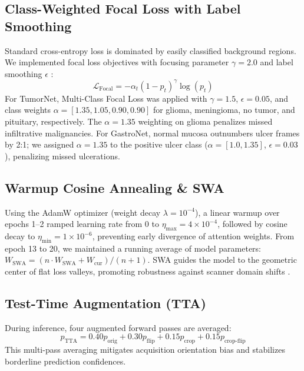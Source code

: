 \documentclass[conference]{IEEEtran}
\begin{document}
\subsection{Class-Weighted Focal Loss with Label Smoothing}
Standard cross-entropy loss is dominated by easily classified background regions. We implemented focal loss objectives \cite{lin2017focal} with focusing parameter $\gamma=2.0$ and label smoothing $\epsilon$ \cite{szegedy2016labelsmooth}:
\begin{equation}
    \mathcal{L}_{\text{Focal}} = -\alpha_t (1 - p_t)^\gamma \log(p_t)
\end{equation}
For TumorNet, Multi-Class Focal Loss was applied with $\gamma=1.5$, $\epsilon=0.05$, and class weights $\alpha = [1.35, 1.05, 0.90, 0.90]$ for glioma, meningioma, no tumor, and pituitary, respectively. The $\alpha=1.35$ weighting on glioma penalizes missed infiltrative malignancies. For GastroNet, normal mucosa outnumbers ulcer frames by 2:1; we assigned $\alpha=1.35$ to the positive ulcer class ($\alpha=[1.0, 1.35]$, $\epsilon=0.03$), penalizing missed ulcerations.

\subsection{Warmup Cosine Annealing \& SWA}
Using the AdamW optimizer (weight decay $\lambda=10^{-4}$), a linear warmup over epochs 1–2 ramped learning rate from 0 to $\eta_{\max} = 4\times 10^{-4}$, followed by cosine decay to $\eta_{\min} = 1\times 10^{-6}$, preventing early divergence of attention weights. From epoch 13 to 20, we maintained a running average of model parameters: $W_{\text{SWA}} = (n \cdot W_{\text{SWA}} + W_{\text{cur}}) / (n + 1)$. SWA guides the model to the geometric center of flat loss valleys, promoting robustness against scanner domain shifts \cite{izmailov2018swa}.

\subsection{Test-Time Augmentation (TTA)}
During inference, four augmented forward passes are averaged:
\begin{equation}
    p_{\text{TTA}} = 0.40 p_{\text{orig}} + 0.30 p_{\text{flip}} + 0.15 p_{\text{crop}} + 0.15 p_{\text{crop-flip}}
\end{equation}
This multi-pass averaging mitigates acquisition orientation bias and stabilizes borderline prediction confidences.
\end{document}
